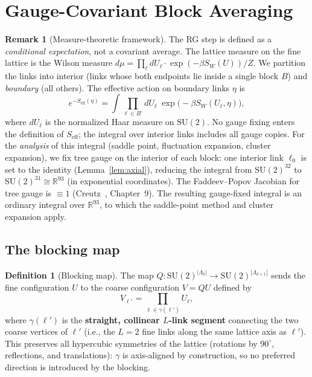 \documentclass[11pt]{article}
\theoremstyle{definition}
\newtheorem{definition}[theorem]{Definition}
\newtheorem{remark}[theorem]{Remark}
\newcommand{\SU}{\mathrm{SU}}
\newcommand{\R}{\mathbb{R}}
\begin{document}
\section{Gauge-Covariant Block Averaging}\label{sec:blocking}

\begin{remark}[Measure-theoretic framework]\label{rem:measure}
The RG step is defined as a \emph{conditional expectation},
not a covariant average.  The lattice measure on the fine lattice
is the Wilson measure
$d\mu=\prod_\ell dU_\ell\cdot\exp(-\beta S_W(U))/Z$.
We partition the links into interior (links whose both
endpoints lie inside a single block $B$) and \emph{boundary}
(all others).  The effective action on boundary links $\eta$ is
\[
e^{-S_{\mathrm{eff}}(\eta)}=\int\prod_{\ell\in B^\circ}dU_\ell
\;\exp\bigl(-\beta S_W(U_\ell,\eta)\bigr),
\]
where $dU_\ell$ is the normalized Haar measure on $\SU(2)$.
No gauge fixing enters the definition of $S_{\mathrm{eff}}$; the
integral over interior links includes all gauge copies.
For the \emph{analysis} of this integral (saddle point,
fluctuation expansion, cluster expansion), we fix tree gauge
on the interior of each block: one interior link $\ell_0$ is set
to the identity (Lemma~\ref{lem:axial}), reducing the integral
from $\SU(2)^{32}$ to $\SU(2)^{31}\cong\R^{93}$ (in exponential
coordinates).  The Faddeev--Popov Jacobian for tree gauge is
$\equiv 1$ (Creutz~\cite{Creutz}, Chapter~9).
The resulting gauge-fixed integral is an ordinary integral
over $\R^{93}$, to which the saddle-point method and
cluster expansion apply.
\end{remark}

\subsection{The blocking map}

\begin{definition}[Blocking map]\label{def:blockingmap}
The map $Q:\SU(2)^{|\Lambda_k|}\to\SU(2)^{|\Lambda_{k+1}|}$ sends the
fine configuration $U$ to the coarse configuration $V=QU$ defined by
\begin{equation}
V_{\ell'}=\prod_{\ell\in\gamma(\ell')}U_\ell,
\end{equation}
where $\gamma(\ell')$ is the \textbf{straight, collinear $L$-link
segment} connecting the two coarse vertices of $\ell'$
(i.e., the $L=2$ fine links along the same lattice axis as $\ell'$).
This preserves all hypercubic symmetries of the lattice
(rotations by $90^\circ$, reflections, and translations):
$\gamma$ is axis-aligned by construction, so no preferred
direction is introduced by the blocking.
\end{definition}
\end{document}
